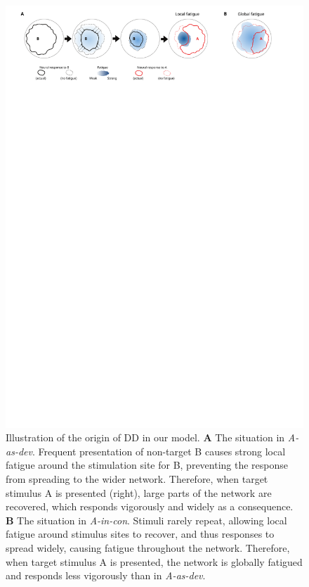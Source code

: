 \documentclass[9pt,lineno,onehalfspacing]{elife}
\newcommand{\dev}{\textit{A-as-dev}}
\newcommand{\msc}{\textit{A-in-con}}
\begin{document}
\begin{figure}
    \includegraphics[width=\linewidth]{fig-concept}
    \caption{%
        Illustration of the origin of DD in our model.
        \textbf{A} The situation in \dev{}. Frequent presentation of non-target B causes strong local fatigue around the stimulation site for B, preventing the response from spreading to the wider network. Therefore, when target stimulus A is presented (right), large parts of the network are recovered, which responds vigorously and widely as a consequence.
        \textbf{B} The situation in \msc{}. Stimuli rarely repeat, allowing local fatigue around stimulus sites to recover, and thus responses to spread widely, causing fatigue throughout the network. Therefore, when target stimulus A is presented, the network is globally fatigued and responds less vigorously than in \dev{}.
    }
    \label{fig:conclusion}
\end{figure}
\end{document}
